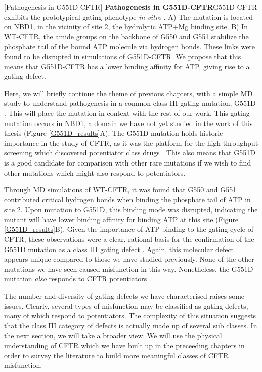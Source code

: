 \begingroup
\captionsetup{singlelinecheck = false, justification=raggedright}
[Pathogenesis in G551D-CFTR] {\textbf{Pathogenesis in G551D-CFTR}}{G551D-CFTR exhibits the prototypical gating phenotype \textit{in vitro} \cite{bompadre2007, wang2020}. A) The mutation is located on NBD1, in the vicinity of site 2, the hydrolytic ATP+Mg binding site. B) In WT-CFTR, the amide groups on the backbone of G550 and G551 stabilize the phosphate tail of the bound ATP molecule via hydrogen bonds. These links were found to be disrupted in simulations of G551D-CFTR. We propose that this means that G551D-CFTR has a lower binding affinity for ATP, giving rise to a gating defect.} 
\label{G551D_results}
\endgroup

Here, we will briefly continue the theme of previous chapters, with a simple MD study to understand pathogenesis in a common class III gating mutation, G551D \cite{li1996}. This will place the mutation in context with the rest of our work. This gating mutation occurs in NBD1, a domain we have not yet studied in the work of this thesis (Figure \ref{G551D_results}A). The G551D mutation holds historic importance in the study of CFTR, as it was the platform for the high-throughput screening which discovered potentiator class drugs \cite{vangoor2009}. This also means that G551D is a good candidate for comparison with other rare mutations if we wish to find other mutations which might also respond to potentiators.

Through MD simulations of WT-CFTR, it was found that G550 and G551 contributed critical hydrogen bonds when binding the phosphate tail of ATP in site 2. Upon mutation to G551D, this binding mode was disrupted, indicating the mutant will have lower binding affinity for binding ATP at this site (Figure \ref{G551D_results}B). Given the importance of ATP binding to the gating cycle of CFTR, these observations were a clear, rational basis for the confirmation of the G551D mutation as a class III gating defect \cite{bompadre2008}. Again, this molecular defect appears unique compared to those we have studied previously. None of the other mutations we have seen caused misfunction in this way. Nonetheless, the G551D mutation \textit{also} responds to CFTR potentiators \cite{vangoor2009,wong2022a,kalydeco_FDA_approval}. 

The number and diversity of gating defects we have characterised raises some issues. Clearly, several types of misfunction may be classified as gating defects, many of which respond to potentiators. The complexity of this situation suggests that the class III category of defects is actually made up of several sub classes. In the next section, we will take a broader view. We will use the physical understanding of CFTR which we have built up in the preceeding chapters in order to survey the literature to build more meaningful classes of CFTR misfunction.

